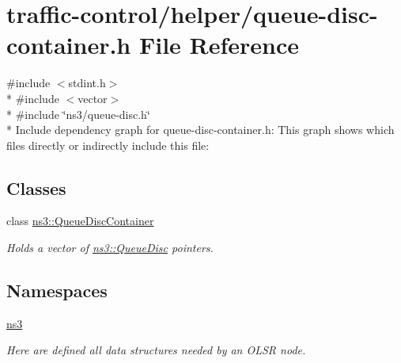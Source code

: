 \hypertarget{queue-disc-container_8h}{}\section{traffic-\/control/helper/queue-\/disc-\/container.h File Reference}
\label{queue-disc-container_8h}
{\ttfamily \#include $<$stdint.\+h$>$}\\*
{\ttfamily \#include $<$vector$>$}\\*
{\ttfamily \#include \char`\"{}ns3/queue-\/disc.\+h\char`\"{}}\\*
Include dependency graph for queue-\/disc-\/container.h\+:
This graph shows which files directly or indirectly include this file\+:
\subsection*{Classes}
\begin{DoxyCompactItemize}
\item 
class \hyperlink{classns3_1_1QueueDiscContainer}{ns3\+::\+Queue\+Disc\+Container}
\begin{DoxyCompactList}\small\item\em Holds a vector of \hyperlink{classns3_1_1QueueDisc}{ns3\+::\+Queue\+Disc} pointers. \end{DoxyCompactList}\end{DoxyCompactItemize}
\subsection*{Namespaces}
\begin{DoxyCompactItemize}
\item 
 \hyperlink{namespacens3}{ns3}
\begin{DoxyCompactList}\small\item\em Here are defined all data structures needed by an O\+L\+SR node. \end{DoxyCompactList}\end{DoxyCompactItemize}
